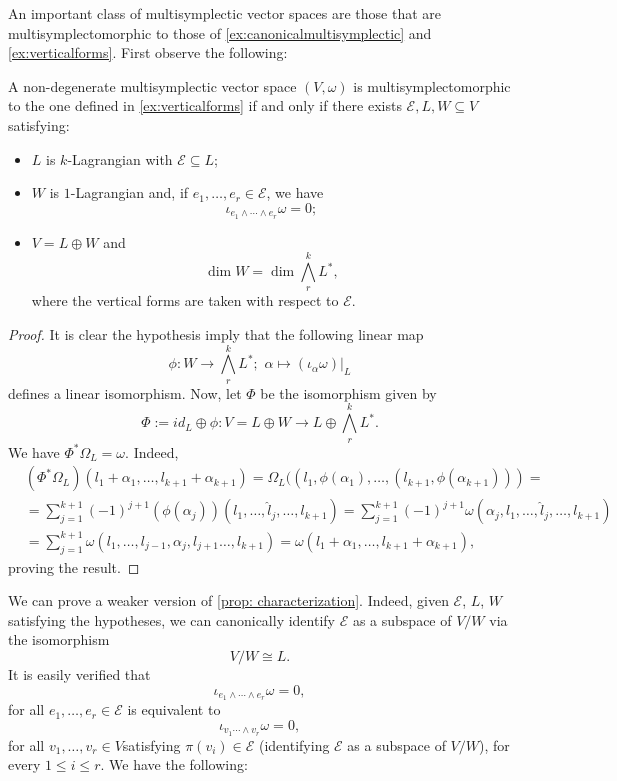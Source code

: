 An important class of multisymplectic vector spaces are those that are multisymplectomorphic to those of \cref{ex:canonicalmultisymplectic} and \cref{ex:verticalforms}. First observe the following:
\begin{proposition}\label{prop: characterization} A non-degenerate multisymplectic vector space $(V, \omega)$ is multisymplectomorphic to the one defined in \cref{ex:verticalforms} if and only if there exists $\mathcal{E}, L, W \subseteq V$ satisfying:
\begin{itemize}
    \item $L$ is $k$-Lagrangian with $\mathcal{E} \subseteq L$;
    \item $W$ is $1$-Lagrangian and, if $e_1, \dots, e_r \in \mathcal{E}$, we have $$\iota_{e_1 \wedge \cdots \wedge e_r} \omega = 0;$$
    \item $V = L \oplus W$ and $$\dim W = \dim \bigwedge ^k_r L^\ast,$$ where the vertical forms are taken with respect to $\mathcal{E}.$
\end{itemize}
\end{proposition}
\begin{proof} It is clear the hypothesis imply that the following linear map $$\phi: W \rightarrow \bigwedge^k_r L^\ast; \,\, \alpha \mapsto (\iota_\alpha \omega) |_L$$ defines a linear isomorphism. Now, let $\Phi$ be the isomorphism given by $$\Phi:= id_L \oplus \phi: V = L \oplus W \rightarrow L \oplus \bigwedge^k_r L^\ast.$$ We have $\Phi^\ast \Omega_L = \omega.$ Indeed,
\begin{align*}
    &(\Phi^\ast \Omega_L) (l_1 + \alpha_1, \dots, l_{k +1}+ \alpha_{k +1}) = \Omega_L((l_1, \phi(\alpha_1), \dots, (l_{k+1}, \phi(\alpha_{k+1}))) = \\
    &= \sum_{j = 1}^{k+1} (-1)^{j+1} (\phi(\alpha_j))(l_1, \dots, \hat{l}_j, \dots, l_{k+1})= \sum_{j= 1}^{k+1} (-1)^{j+1}\omega( \alpha_j, l_1, \dots, \hat{l}_j, \dots, l_{k+1}) \\
    &= \sum_{j= 1}^{k+1} \omega( l_1, \dots, l_{j-1}, \alpha_j, l_{j+1} \dots, l_{k+1}) = \omega(l_1 + \alpha_1, \dots, l_{k +1}+ \alpha_{k +1}),
\end{align*}
proving the result.
\end{proof}
We can prove a weaker version of \cref{prop: characterization}. Indeed, given $\mathcal{E}$, $L$, $W$ satisfying the hypotheses, we can canonically identify $\mathcal{E}$ as a subspace of $V/W$ via the isomorphism $$V/W \cong L.$$ It is easily verified that $$\iota_{ e_1 \wedge \cdots \wedge e_r} \omega = 0,$$ for all $e_1, \dots, e_r \in \mathcal{E}$ is equivalent to $$\iota_{v_1 \cdots \wedge v_r} \omega = 0,$$ for all $v_1, \dots, v_r \in V$satisfying $\pi(v_i) \in \mathcal{E}$ (identifying $\mathcal{E}$ as a subspace of $V/W$), for every $1 \leq i \leq r.$ We have the following:
